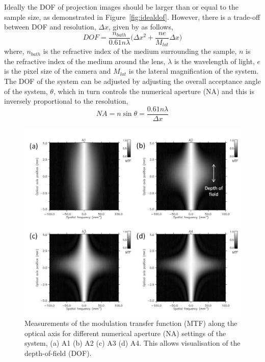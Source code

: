 	



Ideally the DOF of projection images should be larger than or equal to the sample size, as demonstrated in Figure~\ref{fig:idealdof}. However, there is a trade-off between DOF and resolution,  $\Delta x$, given by \cite{inoue1997video} as follows,
\begin{equation}
DOF = \frac{n_{bath}}{0.61 n \lambda} \big(\Delta x^2 + \frac{ne}{M_{lat}} \Delta x \big)
\label{eqn:1DOF}
\end{equation}
where, $n_{bath}$ is the refractive index of the medium surrounding the sample, $n$ is the refractive index of the medium around the lens, $\lambda$ is the wavelength of light, $e$ is the pixel size of the camera and $M_{lat}$ is the lateral magnification of the system. The DOF of the system can be adjusted by adjusting the overall acceptance angle of the system, $\theta$, which in turn controls the numerical aperture (NA) and this is inversely proportional to the resolution, 
\begin{equation}
NA = n \sin \theta = \frac{0.61n\lambda}{\Delta x}
\label{eqn:2NA}
\end{equation}



	\begin{figure}[H]
		\centering
		\includegraphics[width=0.9\linewidth]{mrt_img/mrt_Fig6}
		\caption{Measurements of the modulation transfer function (MTF) along the optical axis for different numerical aperture (NA) settings of the system, (a) A1 (b) A2 (c) A3 (d) A4. This allows visualisation of the depth-of-field (DOF).}
		\label{fig:MTFDOF}
	\end{figure}
	
